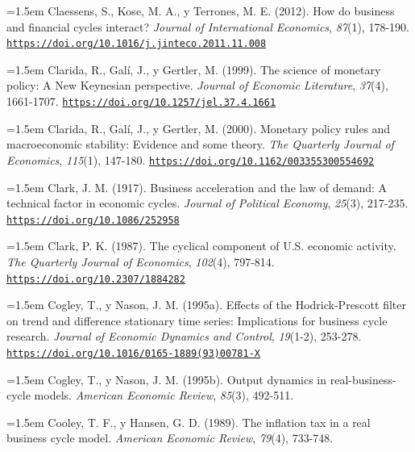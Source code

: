 \documentclass[10pt,a4paper]{article}
\begin{document}
\noindent\hangindent=1.5em Claessens, S., Kose, M. A., y Terrones, M. E. (2012). How do business and financial cycles interact? \textit{Journal of International Economics}, \textit{87}(1), 178-190. \href{https://doi.org/10.1016/j.jinteco.2011.11.008}{\nolinkurl{https://doi.org/10.1016/j.jinteco.2011.11.008}}

\noindent\hangindent=1.5em Clarida, R., Galí, J., y Gertler, M. (1999). The science of monetary policy: A New Keynesian perspective. \textit{Journal of Economic Literature}, \textit{37}(4), 1661-1707. \href{https://doi.org/10.1257/jel.37.4.1661}{\nolinkurl{https://doi.org/10.1257/jel.37.4.1661}}

\noindent\hangindent=1.5em Clarida, R., Galí, J., y Gertler, M. (2000). Monetary policy rules and macroeconomic stability: Evidence and some theory. \textit{The Quarterly Journal of Economics}, \textit{115}(1), 147-180. \href{https://doi.org/10.1162/003355300554692}{\nolinkurl{https://doi.org/10.1162/003355300554692}}

\noindent\hangindent=1.5em Clark, J. M. (1917). Business acceleration and the law of demand: A technical factor in economic cycles. \textit{Journal of Political Economy}, \textit{25}(3), 217-235. \href{https://doi.org/10.1086/252958}{\nolinkurl{https://doi.org/10.1086/252958}}

\noindent\hangindent=1.5em Clark, P. K. (1987). The cyclical component of U.S. economic activity. \textit{The Quarterly Journal of Economics}, \textit{102}(4), 797-814. \href{https://doi.org/10.2307/1884282}{\nolinkurl{https://doi.org/10.2307/1884282}}

\noindent\hangindent=1.5em Cogley, T., y Nason, J. M. (1995a). Effects of the Hodrick-Prescott filter on trend and difference stationary time series: Implications for business cycle research. \textit{Journal of Economic Dynamics and Control}, \textit{19}(1-2), 253-278. \href{https://doi.org/10.1016/0165-1889(93)00781-X}{\nolinkurl{https://doi.org/10.1016/0165-1889(93)00781-X}}

\noindent\hangindent=1.5em Cogley, T., y Nason, J. M. (1995b). Output dynamics in real-business-cycle models. \textit{American Economic Review}, \textit{85}(3), 492-511.

\noindent\hangindent=1.5em Cooley, T. F., y Hansen, G. D. (1989). The inflation tax in a real business cycle model. \textit{American Economic Review}, \textit{79}(4), 733-748.
\end{document}

